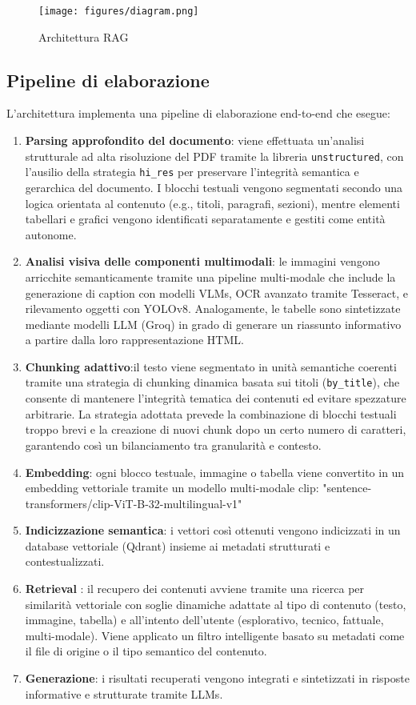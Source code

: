 \begin{figure}[!ht]
\centering
\texttt{[image: figures/diagram.png]}
\caption{Architettura RAG}
\end{figure}

\subsection{Pipeline di elaborazione}
L'architettura implementa una pipeline di elaborazione end-to-end che esegue:
\begin{enumerate}
    \item \textbf{Parsing approfondito del documento}: viene effettuata un'analisi strutturale ad alta risoluzione del PDF tramite la libreria \verb|unstructured|, con l'ausilio della strategia \verb|hi_res| per preservare l'integrità semantica e gerarchica del documento. I blocchi testuali vengono segmentati secondo una logica orientata al contenuto (e.g., titoli, paragrafi, sezioni), mentre elementi tabellari e grafici vengono identificati separatamente e gestiti come entità autonome.
    \item \textbf{Analisi visiva delle componenti multimodali}: le immagini vengono arricchite semanticamente tramite una pipeline multi-modale che include la generazione di caption con modelli VLMs, OCR avanzato tramite Tesseract, e rilevamento oggetti con YOLOv8. Analogamente, le tabelle sono sintetizzate mediante modelli LLM (Groq) in grado di generare un riassunto informativo a partire dalla loro rappresentazione HTML.
    \item \textbf{Chunking adattivo}:il testo viene segmentato in unità semantiche coerenti tramite una strategia di chunking dinamica basata sui titoli (\verb|by_title|), che consente di mantenere l’integrità tematica dei contenuti ed evitare spezzature arbitrarie. La strategia adottata prevede la combinazione di blocchi testuali troppo brevi  e la creazione di nuovi chunk dopo un certo numero di caratteri, garantendo così un bilanciamento tra granularità e contesto.
    \item \textbf{Embedding}: ogni blocco testuale, immagine o tabella viene convertito in un embedding vettoriale tramite un modello multi-modale clip: "sentence-transformers/clip-ViT-B-32-multilingual-v1" 
    \item \textbf{Indicizzazione semantica}: i vettori così ottenuti vengono indicizzati in un database vettoriale (Qdrant) insieme ai metadati strutturati e contestualizzati.
    \item \textbf{Retrieval }: il recupero dei contenuti avviene tramite una ricerca per similarità vettoriale con soglie dinamiche adattate al tipo di contenuto (testo, immagine, tabella) e all’intento dell’utente (esplorativo, tecnico, fattuale, multi-modale). Viene applicato un filtro intelligente basato su metadati come il file di origine o il tipo semantico del contenuto.
    \item \textbf{Generazione}:  i risultati recuperati vengono integrati e sintetizzati in risposte informative e strutturate tramite LLMs.
\end{enumerate}
